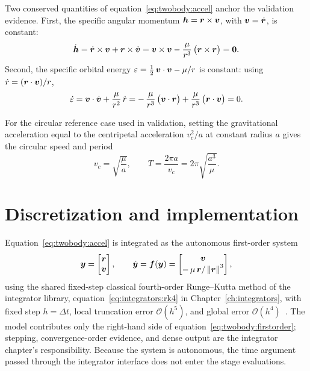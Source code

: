 Two conserved quantities of equation~\eqref{eq:twobody:accel} anchor the
validation evidence. First, the specific angular momentum
$\bm{h} = \bm{r} \times \bm{v}$, with $\bm{v} = \dot{\bm{r}}$, is constant:
\begin{equation}
  \dot{\bm{h}}
    = \dot{\bm{r}} \times \bm{v} + \bm{r} \times \dot{\bm{v}}
    = \bm{v} \times \bm{v}
      - \frac{\mu}{r^{3}}\,\bigl(\bm{r} \times \bm{r}\bigr)
    = \bm{0}.
  \label{eq:twobody:hconst}
\end{equation}
Second, the specific orbital energy
$\varepsilon = \tfrac{1}{2}\,\bm{v}\cdot\bm{v} - \mu/r$ is constant: using
$\dot{r} = (\bm{r} \cdot \bm{v})/r$,
\begin{equation}
  \dot{\varepsilon}
    = \bm{v} \cdot \dot{\bm{v}} + \frac{\mu}{r^{2}}\,\dot{r}
    = -\,\frac{\mu}{r^{3}}\,\bigl(\bm{v} \cdot \bm{r}\bigr)
      + \frac{\mu}{r^{3}}\,\bigl(\bm{r} \cdot \bm{v}\bigr)
    = 0.
  \label{eq:twobody:energyconst}
\end{equation}

For the circular reference case used in validation, setting the gravitational
acceleration equal to the centripetal acceleration $v_c^{2}/a$ at constant
radius $a$ gives the circular speed and period
\begin{equation}
  v_c = \sqrt{\frac{\mu}{a}},
  \qquad
  T = \frac{2 \pi a}{v_c} = 2 \pi \sqrt{\frac{a^{3}}{\mu}}.
  \label{eq:twobody:period}
\end{equation}

\section{Discretization and implementation}
\label{sec:twobody:implementation}

Equation~\eqref{eq:twobody:accel} is integrated as the autonomous first-order
system
\begin{equation}
  \bm{y} =
  \begin{bmatrix} \bm{r} \\ \bm{v} \end{bmatrix},
  \qquad
  \dot{\bm{y}} = \bm{f}(\bm{y}) =
  \begin{bmatrix} \bm{v} \\ -\,\mu\,\bm{r}/\left\lVert \bm{r} \right\rVert^{3} \end{bmatrix},
  \label{eq:twobody:firstorder}
\end{equation}
using the shared fixed-step classical fourth-order Runge--Kutta method of
the integrator library, equation~\eqref{eq:integrators:rk4} in
Chapter~\ref{ch:integrators}, with fixed step $h = \Delta t$, local
truncation error $\mathcal{O}(h^{5})$, and global error
$\mathcal{O}(h^{4})$~\cite{hairer1993}. The model contributes only the
right-hand side of equation~\eqref{eq:twobody:firstorder}; stepping,
convergence-order evidence, and dense output are the integrator chapter's
responsibility. Because the system is autonomous, the time argument passed
through the integrator interface does not enter the stage evaluations.

